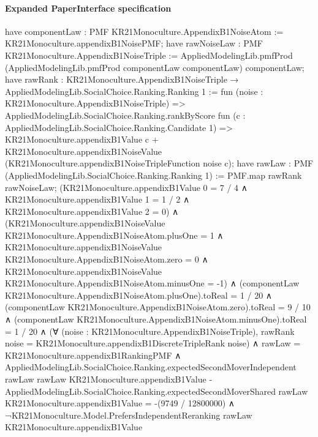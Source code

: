 \documentclass[10pt]{article}
\begin{document}
\paragraph{Expanded PaperInterface specification}
\begin{ReviewVerbatim}
have componentLaw : PMF KR21Monoculture.AppendixB1NoiseAtom := KR21Monoculture.appendixB1NoisePMF;
have rawNoiseLaw : PMF KR21Monoculture.AppendixB1NoiseTriple :=
  AppliedModelingLib.pmfProd (AppliedModelingLib.pmfProd componentLaw componentLaw) componentLaw;
have rawRank : KR21Monoculture.AppendixB1NoiseTriple → AppliedModelingLib.SocialChoice.Ranking.Ranking 1 :=
  fun (noise : KR21Monoculture.AppendixB1NoiseTriple) =>
  AppliedModelingLib.SocialChoice.Ranking.rankByScore fun (c : AppliedModelingLib.SocialChoice.Ranking.Candidate 1) =>
    KR21Monoculture.appendixB1Value c +
      KR21Monoculture.appendixB1NoiseValue (KR21Monoculture.appendixB1NoiseTripleFunction noise c);
have rawLaw : PMF (AppliedModelingLib.SocialChoice.Ranking.Ranking 1) := PMF.map rawRank rawNoiseLaw;
(KR21Monoculture.appendixB1Value 0 = 7 / 4 ∧
    KR21Monoculture.appendixB1Value 1 = 1 / 2 ∧ KR21Monoculture.appendixB1Value 2 = 0) ∧
  (KR21Monoculture.appendixB1NoiseValue KR21Monoculture.AppendixB1NoiseAtom.plusOne = 1 ∧
      KR21Monoculture.appendixB1NoiseValue KR21Monoculture.AppendixB1NoiseAtom.zero = 0 ∧
        KR21Monoculture.appendixB1NoiseValue KR21Monoculture.AppendixB1NoiseAtom.minusOne = -1) ∧
    (componentLaw KR21Monoculture.AppendixB1NoiseAtom.plusOne).toReal = 1 / 20 ∧
      (componentLaw KR21Monoculture.AppendixB1NoiseAtom.zero).toReal = 9 / 10 ∧
        (componentLaw KR21Monoculture.AppendixB1NoiseAtom.minusOne).toReal = 1 / 20 ∧
          (∀ (noise : KR21Monoculture.AppendixB1NoiseTriple),
              rawRank noise = KR21Monoculture.appendixB1DiscreteTripleRank noise) ∧
            rawLaw = KR21Monoculture.appendixB1RankingPMF ∧
              AppliedModelingLib.SocialChoice.Ranking.expectedSecondMoverIndependent rawLaw rawLaw
                      KR21Monoculture.appendixB1Value -
                    AppliedModelingLib.SocialChoice.Ranking.expectedSecondMoverShared rawLaw
                      KR21Monoculture.appendixB1Value =
                  -(9749 / 12800000) ∧
                ¬KR21Monoculture.Model.PrefersIndependentReranking rawLaw KR21Monoculture.appendixB1Value
\end{ReviewVerbatim}
\end{document}
